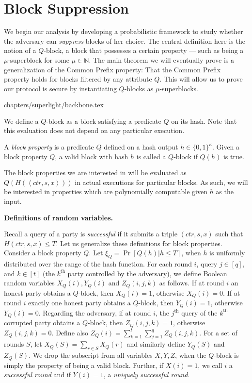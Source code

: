 \section{Block Suppression}

We begin our analysis by developing a probabilistic framework to
study whether the adversary can \emph{suppress} blocks of her
choice. The central definition here is the notion of a $Q$-block,
a block that possesses a certain property --- such as being a
$\mu$-superblock for some $\mu \in \mathbb{N}$. The main theorem
we will eventually prove is a generalization of the Common Prefix
property: That the Common Prefix property holds for blocks filtered
by any attribute $Q$. This will allow us to prove our protocol
is secure by instantiating $Q$-blocks as $\mu$-superblocks.

{chapters/superlight/backbone.tex}

We define a $Q$-block as a block satisfying a predicate $Q$ on its hash.
Note that this evaluation does not depend on any particular execution.

\begin{definition}[$Q$-block]
	A \emph{block property} is a predicate $Q$ defined on a hash output
	$h \in \{0, 1\}^\kappa$.
	Given a block property $Q$, a valid block with hash $h$ is called
	a $Q$-block if $Q(h)$ is true.
\end{definition}

The block properties we are interested in will be evaluated as
$Q(H(\left<ctr, s, x\right>))$
in actual
executions for particular blocks. As
such, we will be interested in properties which are polynomially
computable given $h$ as the input.


\noindent
\textbf{Definitions of random variables.}

Recall a query of a party is \emph{successful} if it submits a triple
$(ctr,s,x)$ such that $H(ctr,s,x)\leq T$.
Let us generalize these definitions for block properties.
Consider a block property $Q$. Let $\xi_Q=\Pr[Q(h)|h\leq T]$, when $h$ is
uniformly distributed over the range of the hash function.
For each round $i$, query $j\in[q]$, and $k\in[t]$ (the $k^\text{th}$ party
controlled by the adversary), we define Boolean random
variables $X_Q(i),Y_Q(i)$ and $Z_Q(i,j,k)$ as follows.
If at round $i$ an honest party obtains a $Q$-block, then $X_Q(i)=1$,
otherwise $X_Q(i)=0$.
If at round $i$ exactly one honest party obtains a $Q$-block, then
$Y_Q(i)=1$, otherwise $Y_Q(i)=0$.
Regarding the adversary, if at round $i$, the $j^\text{th}$ query of the $k^\text{th}$
corrupted party obtains a $Q$-block, then $Z_Q(i,j,k)=1$, otherwise
$Z_Q(i,j,k)=0$.
Define also $Z_Q(i)=\sum_{k=1}^t\sum_{j=1}^qZ_Q(i,j,k)$.
For a set of rounds $S$, let $X_Q(S)=\sum_{r\in S}X_Q(r)$ and similarly
define $Y_Q(S)$ and $Z_Q(S)$.
We drop the subscript from all variables $X,Y,Z$, when the $Q$-block is
simply the property of being a valid block.
Further, if $X(i)=1$, we call $i$ a \emph{successful round} and if
$Y(i)=1$, a \emph{uniquely successful round}.

